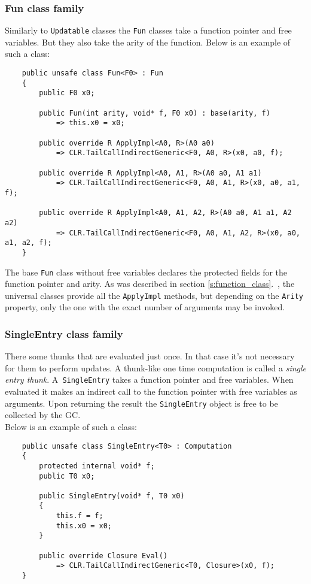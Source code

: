 \documentclass[en]{pracamgr}
\newcommand{\myref}[1]{\ref{#1}.~\nameref{#1}}
\begin{document}
\subsubsection{Fun class family}

Similarly to \texttt{Updatable} classes the \texttt{Fun}
classes take a function pointer and free variables. But they also take the arity of the function. Below is an example of such a class:

\begin{verbatim}
    public unsafe class Fun<F0> : Fun
    {
        public F0 x0;

        public Fun(int arity, void* f, F0 x0) : base(arity, f)
            => this.x0 = x0;

        public override R ApplyImpl<A0, R>(A0 a0)
            => CLR.TailCallIndirectGeneric<F0, A0, R>(x0, a0, f);

        public override R ApplyImpl<A0, A1, R>(A0 a0, A1 a1)
            => CLR.TailCallIndirectGeneric<F0, A0, A1, R>(x0, a0, a1, f);

        public override R ApplyImpl<A0, A1, A2, R>(A0 a0, A1 a1, A2 a2)
            => CLR.TailCallIndirectGeneric<F0, A0, A1, A2, R>(x0, a0, a1, a2, f);
    }
\end{verbatim}

The base \texttt{Fun} class without free variables declares the protected fields for the function pointer and arity. As was described in section \myref{s:function_class}, the universal classes provide all the \texttt{ApplyImpl} methods, but depending on the \texttt{Arity} property, only the one with the exact number of arguments may be invoked.

\subsubsection{SingleEntry class family}

There some thunks that are evaluated just once. In that case
it's not necessary for them to perform updates.
A thunk-like one time computation is called a \textit{single entry thunk}.
A~\texttt{SingleEntry} takes a function pointer and free
variables. When evaluated it makes an indirect call to the
function pointer with free variables as arguments.
Upon returning the result the \texttt{SingleEntry} object
is free to be collected by the GC.
\\ Below is an example of such a class:

\begin{verbatim}
    public unsafe class SingleEntry<T0> : Computation
    {
        protected internal void* f;
        public T0 x0;

        public SingleEntry(void* f, T0 x0)
        {
            this.f = f;
            this.x0 = x0;
        }

        public override Closure Eval()
            => CLR.TailCallIndirectGeneric<T0, Closure>(x0, f);
    }
\end{verbatim}
\end{document}
